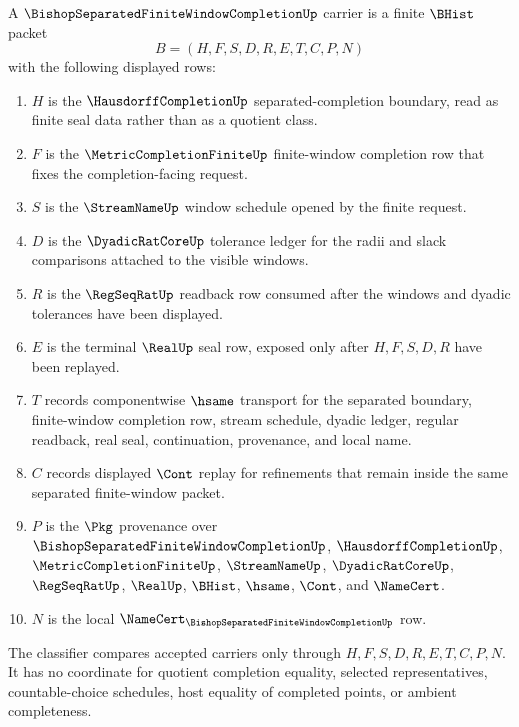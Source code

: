 \begin{definition}
\label{def:bishop-separated-finite-window-completion-carrier}
A $\BishopSeparatedFiniteWindowCompletionUp$ carrier is a finite $\BHist$ packet
$$
B=(H,F,S,D,R,E,T,C,P,N)
$$
with the following displayed rows:
\begin{enumerate}
\item $H$ is the $\HausdorffCompletionUp$ separated-completion boundary, read as finite seal data rather than as a quotient class.
\item $F$ is the $\MetricCompletionFiniteUp$ finite-window completion row that fixes the completion-facing request.
\item $S$ is the $\StreamNameUp$ window schedule opened by the finite request.
\item $D$ is the $\DyadicRatCoreUp$ tolerance ledger for the radii and slack comparisons attached to the visible windows.
\item $R$ is the $\RegSeqRatUp$ readback row consumed after the windows and dyadic tolerances have been displayed.
\item $E$ is the terminal $\RealUp$ seal row, exposed only after $H,F,S,D,R$ have been replayed.
\item $T$ records componentwise $\hsame$ transport for the separated boundary, finite-window completion row, stream schedule, dyadic ledger, regular readback, real seal, continuation, provenance, and local name.
\item $C$ records displayed $\Cont$ replay for refinements that remain inside the same separated finite-window packet.
\item $P$ is the $\Pkg$ provenance over $\BishopSeparatedFiniteWindowCompletionUp$, $\HausdorffCompletionUp$, $\MetricCompletionFiniteUp$, $\StreamNameUp$, $\DyadicRatCoreUp$, $\RegSeqRatUp$, $\RealUp$, $\BHist$, $\hsame$, $\Cont$, and $\NameCert$.
\item $N$ is the local $\NameCert_{\BishopSeparatedFiniteWindowCompletionUp}$ row.
\end{enumerate}
The classifier compares accepted carriers only through $H,F,S,D,R,E,T,C,P,N$. It has no coordinate for quotient completion equality, selected representatives, countable-choice schedules, host equality of completed points, or ambient completeness.
\end{definition}

